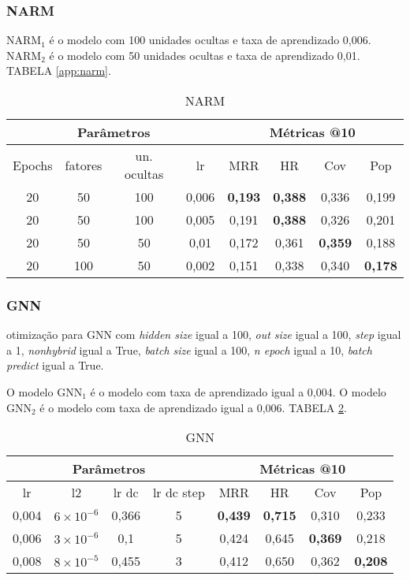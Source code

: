 \subsubsection{NARM}
$\text{NARM}_{1}$ é o modelo com 100 unidades ocultas e taxa de aprendizado 0,006.
$\text{NARM}_{2}$ é o modelo com 50 unidades ocultas e taxa de aprendizado 0,01.
TABELA \ref{app:narm}.
\begin{table}[htbp]
  \centering
  \begin{tabular}{|c|c|c|c|c|c|c|c|}
    \hline
      \multicolumn{4}{|c|}{Parâmetros} & \multicolumn{4}{c|}{Métricas @10} \\
      \hline
      Epochs & fatores & un. ocultas & lr & MRR & HR & Cov & Pop \\
      \hline
      20 & 50 & 100 & 0,006 & \textbf{0,193} & \textbf{0,388} & 0,336 & 0,199 \\
      \hline
      20 & 50 & 100 & 0,005 & 0,191 & \textbf{0,388} & 0,326 & 0,201 \\
      \hline
      20 & 50 & 50 & 0,01 & 0,172 & 0,361 & \textbf{0,359} & 0,188 \\
      \hline
      20 & 100 & 50 & 0,002 & 0,151 & 0,338 & 0,340 & \textbf{0,178} \\
      \hline
      \end{tabular}
      \caption{NARM}
      \label{abb:narm}
\end{table}

\subsubsection{GNN}
otimização para GNN com \textit{hidden size} igual a 100, \textit{out size} igual a 100,
\textit{step} igual a 1, \textit{nonhybrid} igual a True, \textit{batch size} igual a 100,
\textit{n epoch} igual a 10, \textit{batch predict} igual a True.

O modelo $\text{GNN}_{1}$ é o modelo com taxa de aprendizado igual a 0,004.
O modelo $\text{GNN}_{2}$ é o modelo com taxa de aprendizado igual a 0,006. TABELA \ref{app:gnn}.
\begin{table}[htbp]
  \centering
  \begin{tabular}{|c|c|c|c|c|c|c|c|}
    \hline
      \multicolumn{4}{|c|}{Parâmetros} & \multicolumn{4}{c|}{Métricas @10} \\
      \hline
      lr & l2 & lr dc & lr dc step & MRR & HR & Cov & Pop \\
      \hline
      0,004 & $6 \times 10^{-6}$ & 0,366 & 5 & \textbf{0,439} & \textbf{0,715} & 0,310 & 0,233 \\
      \hline
      0,006 & $3 \times 10^{-6}$ & 0,1 & 5 & 0,424 & 0,645 & \textbf{0,369} & 0,218 \\
      \hline
      0,008 & $8 \times 10^{-5}$ & 0,455 & 3 & 0,412 & 0,650 & 0,362 & \textbf{0,208} \\
      \hline
      \end{tabular}
      \caption{GNN}
      \label{app:gnn}
\end{table}

